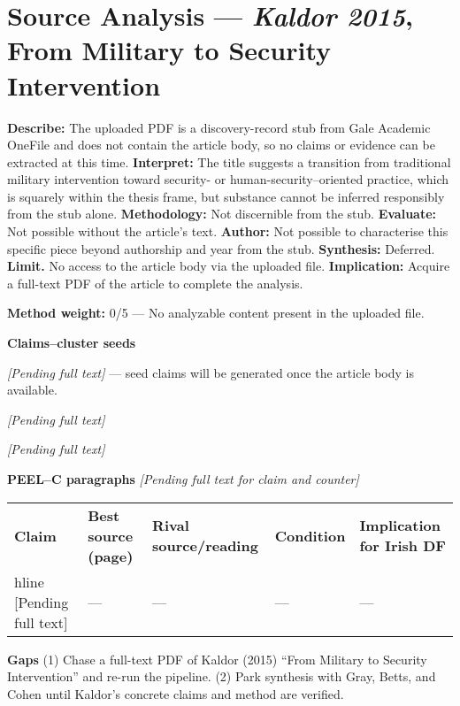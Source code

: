\parencite{KALDOR_2015}

\section*{Source Analysis — \textit{Kaldor 2015}, From Military to Security Intervention}
\textbf{Describe:} The uploaded PDF is a discovery-record stub from Gale Academic OneFile and does not contain the article body, so no claims or evidence can be extracted at this time.
\textbf{Interpret:} The title suggests a transition from traditional military intervention toward security- or human-security–oriented practice, which is squarely within the thesis frame, but substance cannot be inferred responsibly from the stub alone.
\textbf{Methodology:} Not discernible from the stub.
\textbf{Evaluate:} Not possible without the article’s text.
\textbf{Author:} Not possible to characterise this specific piece beyond authorship and year from the stub.
\textbf{Synthesis:} Deferred.
\textbf{Limit.} No access to the article body via the uploaded file.
\textbf{Implication:} Acquire a full-text PDF of the article to complete the analysis.

\textbf{Method weight:} 0/5 — No analyzable content present in the uploaded file.

\textbf{Claims–cluster seeds}

\textit{[Pending full text]} — seed claims will be generated once the article body is available.

\textit{[Pending full text]}

\textit{[Pending full text]}

\textbf{PEEL–C paragraphs}
\textit{[Pending full text for claim and counter]}

\usepackage{array}
\begin{tabular}{p{3.2cm}p{4.2cm}p{3.6cm}p{3.2cm}p{4.2cm}}
	\textbf{Claim} & \textbf{Best source (page)} & \textbf{Rival source/reading} & \textbf{Condition} & \textbf{Implication for Irish DF}\\hline
	[Pending full text] & — & — & — & —\
\end{tabular}

\textbf{Gaps}
(1) Chase a full-text PDF of Kaldor (2015) “From Military to Security Intervention” and re-run the pipeline.
(2) Park synthesis with Gray, Betts, and Cohen until Kaldor’s concrete claims and method are verified.


\parencite{KALDOR_2010}

